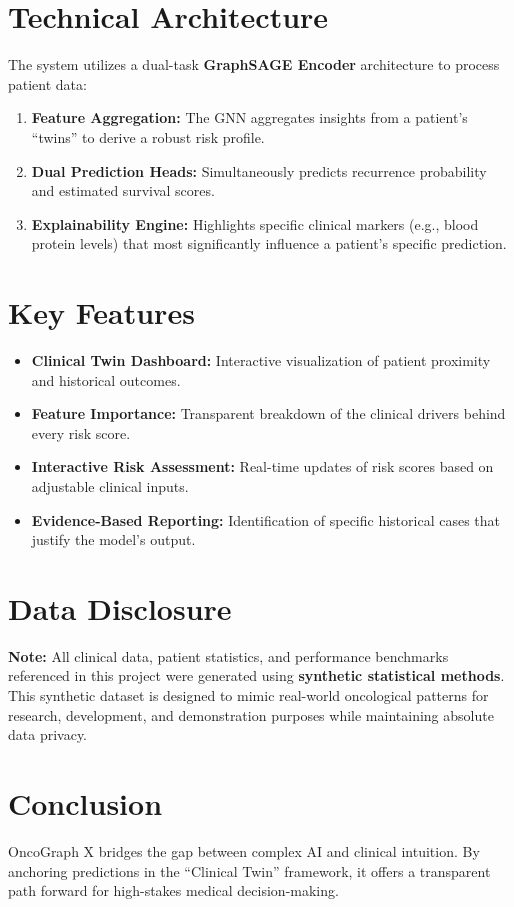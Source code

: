 \documentclass[11pt]{article}
\begin{document}
\section{Technical Architecture}
The system utilizes a dual-task \textbf{GraphSAGE Encoder} architecture to process patient data:
\begin{enumerate}[noitemsep]
    \item \textbf{Feature Aggregation:} The GNN aggregates insights from a patient's ``twins'' to derive a robust risk profile.
    \item \textbf{Dual Prediction Heads:} Simultaneously predicts recurrence probability and estimated survival scores.
    \item \textbf{Explainability Engine:} Highlights specific clinical markers (e.g., blood protein levels) that most significantly influence a patient's specific prediction.
\end{enumerate}

\section{Key Features}
\begin{itemize}
    \item \textbf{Clinical Twin Dashboard:} Interactive visualization of patient proximity and historical outcomes.
    \item \textbf{Feature Importance:} Transparent breakdown of the clinical drivers behind every risk score.
    \item \textbf{Interactive Risk Assessment:} Real-time updates of risk scores based on adjustable clinical inputs.
    \item \textbf{Evidence-Based Reporting:} Identification of specific historical cases that justify the model's output.
\end{itemize}

\section{Data Disclosure}
\textbf{Note:} All clinical data, patient statistics, and performance benchmarks referenced in this project were generated using \textbf{synthetic statistical methods}. This synthetic dataset is designed to mimic real-world oncological patterns for research, development, and demonstration purposes while maintaining absolute data privacy.

\section{Conclusion}
OncoGraph X bridges the gap between complex AI and clinical intuition. By anchoring predictions in the ``Clinical Twin'' framework, it offers a transparent path forward for high-stakes medical decision-making.
\end{document}
